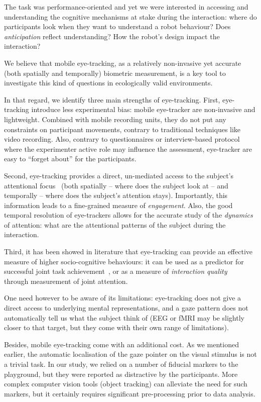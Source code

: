 \documentclass{sig-alternate}
\begin{document}
The task was performance-oriented and yet we were interested in accessing and
understanding the cognitive mechanisms at stake during the interaction: where do participants look when they want to understand a robot behaviour? Does
\emph{anticipation} reflect understanding? How the robot's design impact the
interaction?

We believe that mobile eye-tracking, as a relatively non-invasive yet accurate
(both spatially and temporally) biometric measurement, is a key tool to
investigate this kind of questions in ecologically valid environments.

In that regard, we identify three main strengths of eye-tracking. First,
eye-tracking introduce less experimental bias: mobile eye-tracker are
non-invasive and lightweight. Combined with mobile recording units, they do not
put any constraints on participant movements, contrary to traditional techniques
like video recording. Also, contrary to questionnaires or interview-based
protocol where the experimenter active role may influence the assessment,
eye-tracker are easy to ``forget about'' for the participants.

Second, eye-tracking provides a direct, un-mediated access to the subject's
attentional focus~\cite{sharma2014withmeness} (both spatially -- where does the
subject look at -- and temporally -- where does the subject's attention stays).
Importantly, this information leads to a fine-grained measure of
\emph{engagement}.  Also, the good temporal resolution of eye-trackers allows
for the accurate study of the \emph{dynamics} of attention: what are the
attentional patterns of the subject during the interaction.

Third, it has been showed in literature that eye-tracking can provide an
effective measure of higher socio-cognitive behaviours: it can be used as a
predictor for successful joint task achievement~\cite{sharma2013understanding},
or as a measure of \emph{interaction quality}~\cite{jermann2012effects} through
measurement of joint attention.

One need however to be aware of its limitations: eye-tracking does not give a direct
access to underlying mental representations, and a gaze pattern does not
automatically tell us what the subject think of (EEG or fMRI may be slightly
closer to that target, but they come with their own range of limitations).

Besides, mobile eye-tracking come with an additional cost. As
we mentioned earlier, the automatic localisation of the gaze pointer on
the visual stimulus is not a trivial task. In our study, we relied on a 
number of fiducial markers to the playground, but they were reported as
distractive by the participants. More complex computer vision tools (object
tracking) can alleviate the need for such markers, but it certainly requires
significant pre-processing prior to data analysis.
\end{document}
